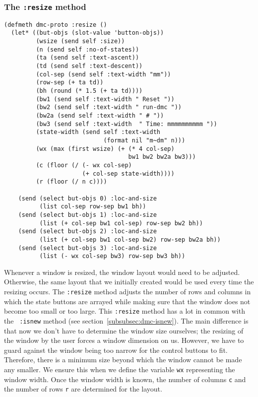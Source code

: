 \subsubsection{The {\tt :resize} method}
\label{subsubsec:resize}
\begin{verbatim}
(defmeth dmc-proto :resize ()
  (let* ((but-objs (slot-value 'button-objs))
         (wsize (send self :size))
         (n (send self :no-of-states))
         (ta (send self :text-ascent))
         (td (send self :text-descent))
         (col-sep (send self :text-width "mm"))
         (row-sep (+ ta td))
         (bh (round (* 1.5 (+ ta td))))
         (bw1 (send self :text-width " Reset "))
         (bw2 (send self :text-width " run-dmc "))
         (bw2a (send self :text-width " # "))
         (bw3 (send self :text-width  " Time: mmmmmmmmmm "))
         (state-width (send self :text-width 
                            (format nil "m~dm" n)))
         (wx (max (first wsize) (+ (* 4 col-sep) 
                                   bw1 bw2 bw2a bw3)))
         (c (floor (/ (- wx col-sep) 
                      (+ col-sep state-width))))
         (r (floor (/ n c))))

    (send (select but-objs 0) :loc-and-size 
          (list col-sep row-sep bw1 bh))
    (send (select but-objs 1) :loc-and-size 
          (list (+ col-sep bw1 col-sep) row-sep bw2 bh))
    (send (select but-objs 2) :loc-and-size
          (list (+ col-sep bw1 col-sep bw2) row-sep bw2a bh))
    (send (select but-objs 3) :loc-and-size
          (list (- wx col-sep bw3) row-sep bw3 bh))
\end{verbatim}
Whenever a window is resized, the window layout would need to be
adjusted.  Otherwise, the same layout that we initially created would be
used every time the resizing occurs.  The {\tt :resize} method adjusts
the number of rows and columns in which the state buttons are arrayed
while making sure that the window does not become too small or too
large. This {\tt :resize} method has a lot in common with the {\tt
  :isnew} method (see section~\ref{subsubsec:dmc-isnew}).  The main
difference is that now we don't have to determine the window size
ourselves;  the resizing of the window by the user forces a window
dimension on us. However, we have to guard against the window being
too narrow for the control buttons to fit. Therefore, there is a
minimum size beyond which the window cannot be made any smaller.  We
ensure this when we define the variable {\tt wx} representing the
window width. Once the window width is known, the number of columns
{\tt c} and the number of rows {\tt r} are determined for the layout.
